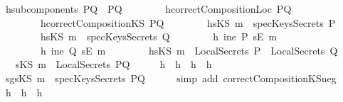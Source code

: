 \begin{isabellebody}
\ h{}{\isacharcolon}{\isachardoublequoteopen}subcomponents\ PQ\ {\isacharequal}\ {\isacharbraceleft}P{\isacharcomma}Q{\isacharbraceright}{\isachardoublequoteclose}\isanewline
\ \ \ \ \ \ \ \ h{}{\isacharcolon}{\isachardoublequoteopen}correctCompositionLoc\ PQ{\isachardoublequoteclose}\isanewline
\ \ \ \ \ \ \ \ h{}{\isacharcolon}{\isachardoublequoteopen}correctCompositionKS\ PQ{\isachardoublequoteclose}\isanewline
\ \ \ \ \ \ \ \ h{}{\isacharcolon}{\isachardoublequoteopen}{\isacharparenleft}sKS\ m{\isacharparenright}\ {\isasymnotin}\ specKeysSecrets\ P{\isachardoublequoteclose}\isanewline
\ \ \ \ \ \ \ \ h{}{\isacharcolon}{\isachardoublequoteopen}{\isacharparenleft}sKS\ m{\isacharparenright}\ {\isasymnotin}\ specKeysSecrets\ Q{\isachardoublequoteclose}\isanewline
\ \ \ \ \ \ \ \ h{}{\isacharcolon}{\isachardoublequoteopen}{\isasymnot}\ ine\ P\ {\isacharparenleft}sE\ m{\isacharparenright}{\isachardoublequoteclose}\isanewline
\ \ \ \ \ \ \ \ h{}{\isacharcolon}{\isachardoublequoteopen}{\isasymnot}\ ine\ Q\ {\isacharparenleft}sE\ m{\isacharparenright}{\isachardoublequoteclose}\isanewline
\ \ \ \ \ \ \ \ h{}{\isacharcolon}{\isachardoublequoteopen}{\isacharparenleft}sKS\ m{\isacharparenright}\ {\isasymnotin}\ {\isacharparenleft}{\isacharparenleft}LocalSecrets\ P{\isacharparenright}\ {\isasymunion}\ {\isacharparenleft}LocalSecrets\ Q{\isacharparenright}{\isacharparenright}{\isachardoublequoteclose}\isanewline
{}\ \ \ {\isachardoublequoteopen}{\isacharparenleft}sKS\ m{\isacharparenright}\ {\isasymnotin}\ {\isacharparenleft}LocalSecrets\ PQ{\isacharparenright}{\isachardoublequoteclose}\isanewline
%
\isadelimproof
%
\endisadelimproof
%
\isatagproof
{}\isamarkupfalse%
\ {\isacharminus}\isanewline
\ \ \isamarkupfalse%
\ h{}\ \ h{}\ \ h{}\ \ h{}\ \isamarkupfalse%
\ sg{}{\isacharcolon}{\isachardoublequoteopen}sKS\ m\ {\isasymnotin}\ specKeysSecrets\ PQ{\isachardoublequoteclose}\isanewline
\ \ \ \ \isamarkupfalse%
\ {\isacharparenleft}simp\ add{\isacharcolon}\ correctCompositionKS{\isacharunderscore}neg{}{\isacharparenright}\ \isanewline
\ \ \isamarkupfalse%
\ h{}\ \ h{}\ \ h{}\ \isamarkupfalse%

\end{isabellebody}
